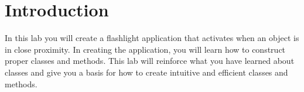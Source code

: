 \section{Introduction}

In this lab you will create a flashlight application that activates when an object is in close proximity.
In creating the application, you will learn how to construct proper classes and methods.
This lab will reinforce what you have learned about classes and give you a basis for how to create intuitive and efficient classes and methods.
